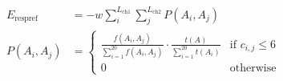 \documentclass[paper=a5,fontsize=16pt]{scrbook}
\begin{document}
            \begin{preview}

            
            \begin{align*}
            E_{\text{respref}} &= -w \sum_{i}^{L_{\text{ch1}}} \sum_{j}^{L_{\text{ch2}}} P(A_i, A_j) \\
            P(A_i, A_j) &=
            \begin{cases}
                \frac{f(A_i, A_j)}{\sum_{i=1}^{20} f(A_i, A_j)} \cdot \frac{t(A)}{\sum_{i=1}^{20} t(A_i)} & \text{if } c_{i,j} \leq 6 \\
                0 & \text{otherwise}
            \end{cases}
            \end{align*}
            


            \end{preview}
            
\end{document}
